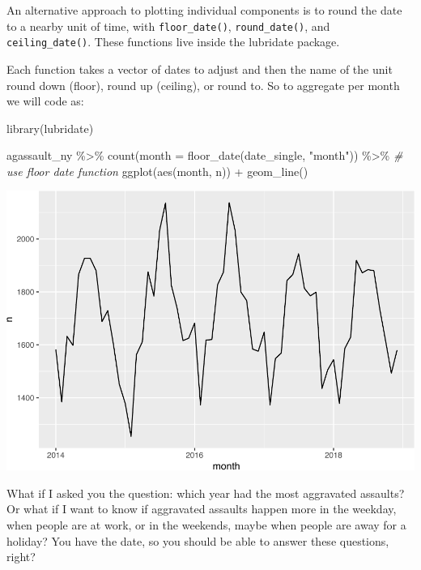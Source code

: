 \documentclass[
  krantz2]{krantz}
\makeatletter
\newenvironment{Shaded}{\begin{snugshade}}{\end{snugshade}}
\newcommand{\AttributeTok}[1]{\textcolor[rgb]{0.61,0.61,0.61}{#1}}
\newcommand{\CommentTok}[1]{\textcolor[rgb]{0.37,0.37,0.37}{\textit{#1}}}
\newcommand{\FunctionTok}[1]{\textcolor[rgb]{0,0,0}{#1}}
\newcommand{\NormalTok}[1]{#1}
\newcommand{\SpecialCharTok}[1]{\textcolor[rgb]{0,0,0}{#1}}
\newcommand{\StringTok}[1]{\textcolor[rgb]{0.5,0.5,0.5}{#1}}
\newenvironment{kframe}{%
\medskip{}
\setlength{\fboxsep}{.8em}
 \def\at@end@of@kframe{}%
 \ifinner\ifhmode%
  \def\at@end@of@kframe{\end{minipage}}%
  \begin{minipage}{\columnwidth}%
 \fi\fi%
 \def\FrameCommand##1{\hskip\@totalleftmargin \hskip-\fboxsep
 \colorbox{shadecolor}{##1}\hskip-\fboxsep
     \hskip-\linewidth \hskip-\@totalleftmargin \hskip\columnwidth}%
 \MakeFramed {\advance\hsize-\width
   \@totalleftmargin\z@ \linewidth\hsize
   \@setminipage}}%
 {\par\unskip\endMakeFramed%
 \at@end@of@kframe}
\renewenvironment{Shaded}{\begin{kframe}}{\end{kframe}}
\makeatother
\begin{document}
An alternative approach to plotting individual components is to round the date to a nearby unit of time, with \texttt{floor\_date()}, \texttt{round\_date()}, and \texttt{ceiling\_date()}. These functions live inside the lubridate package.

Each function takes a vector of dates to adjust and then the name of the unit round down (floor), round up (ceiling), or round to. So to aggregate per month we will code as:

\begin{Shaded}
\begin{Highlighting}[]
\FunctionTok{library}\NormalTok{(lubridate)}

\NormalTok{agassault\_ny }\SpecialCharTok{\%\textgreater{}\%} 
  \FunctionTok{count}\NormalTok{(}\AttributeTok{month =} \FunctionTok{floor\_date}\NormalTok{(date\_single, }\StringTok{"month"}\NormalTok{)) }\SpecialCharTok{\%\textgreater{}\%} \CommentTok{\# use floor date function}
  \FunctionTok{ggplot}\NormalTok{(}\FunctionTok{aes}\NormalTok{(month, n)) }\SpecialCharTok{+}
    \FunctionTok{geom\_line}\NormalTok{()}
\end{Highlighting}
\end{Shaded}

\includegraphics{crime_mapping_files/figure-latex/ggplot_rounding_8b-1.pdf}

What if I asked you the question: which year had the most aggravated assaults? Or what if I want to know if aggravated assaults happen more in the weekday, when people are at work, or in the weekends, maybe when people are away for a holiday? You have the date, so you should be able to answer these questions, right?
\end{document}
